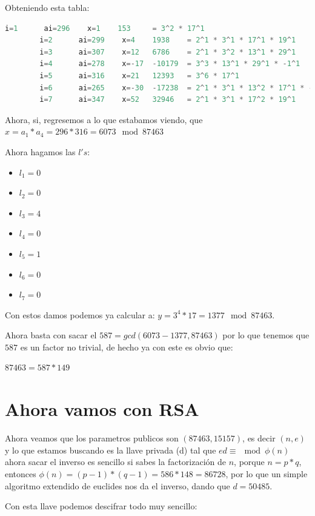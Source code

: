 \documentclass[12pt, fleqn]{report}                             %
\theoremstyle{break}                                            %
\begin{document}
      Obteniendo esta tabla:
      \begin{lstlisting}[language=Python, gobble=6]
        i=1      ai=296    x=1    153     = 3^2 * 17^1 
        i=2      ai=299    x=4    1938    = 2^1 * 3^1 * 17^1 * 19^1 
        i=3      ai=307    x=12   6786    = 2^1 * 3^2 * 13^1 * 29^1 
        i=4      ai=278    x=-17  -10179  = 3^3 * 13^1 * 29^1 * -1^1 
        i=5      ai=316    x=21   12393   = 3^6 * 17^1 
        i=6      ai=265    x=-30  -17238  = 2^1 * 3^1 * 13^2 * 17^1 * -1^1 
        i=7      ai=347    x=52   32946   = 2^1 * 3^1 * 17^2 * 19^1 
      \end{lstlisting}


      Ahora, si, regresemos a lo que estabamos viendo, que $x = a_1 * a_4 = 296 * 316 = 6073 \mod{87463}$

      Ahora hagamos las $l's$:
      \begin{itemize}
      \item $l_1 = 0$
      \item $l_2 = 0$
      \item $l_3 = 4$
      \item $l_4 = 0$
      \item $l_5 = 1$
      \item $l_6 = 0$
      \item $l_7 = 0$
      \end{itemize}

      Con estos damos podemos ya calcular a: $y = 3^4 * 17 = 1377 \mod{87463}$.

      Ahora basta con sacar el $587 = gcd(6073 - 1377, 87463)$ 
      por lo que tenemos que $587$ es un factor no trivial, de hecho ya con este es obvio que:

      $87463 = 587 * 149$
    
  \clearpage
  \section{Ahora vamos con RSA}

    Ahora veamos que los parametros publicos son $(87463, 15157)$, es decir $(n, e)$
    y lo que estamos buscando es la llave privada (d) tal que $ed \equiv \mod{\phi(n)}$
    ahora sacar el inverso es sencillo si sabes la factorización de $n$, porque $n = p * q$, 
    entonces $\phi(n) = (p -1) * (q - 1) =  586 * 148 = 86728$, por lo que un simple algoritmo
    extendido de euclides nos da el inverso, dando que $d = 50485$.

    Con esta llave podemos descifrar todo muy sencillo:
\end{document}
